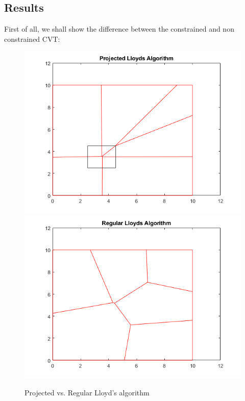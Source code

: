 \documentclass{iacas}
\begin{document}
\subsection{Results}
First of all, we shall show the difference between the constrained and non constrained CVT:
\begin{figure}[!ht]
\centering
\includegraphics[scale=0.5]{figures/results/constrainedVoronoi.png} \includegraphics[scale=0.5]{figures/results/unconstrainedVoronoi.png}
\caption{Projected vs. Regular Lloyd's algorithm}
\end{figure}
\end{document}
